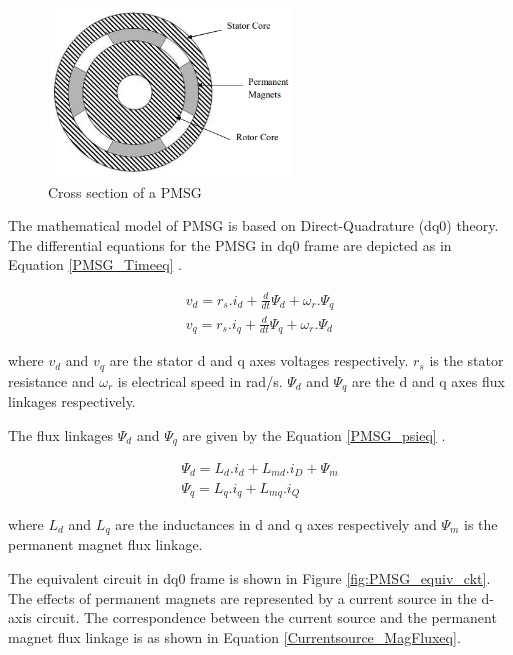 \begin{figure}[]
\centering
    \includegraphics[height = 4.5cm,width = 6.5cm]{Diagrams/Chapter_2/PMSG.PNG}
    \caption{Cross section of a PMSG \cite{sebastian_transient_1989}}
    \label{fig:PMSG}
\end{figure}

The mathematical model of \gls{PMSG} is based on Direct-Quadrature (dq0) theory. The differential equations for the \gls{PMSG} in dq0 frame are depicted as in Equation \ref{PMSG_Timeeq} \cite{sebastian_transient_1989}.  

\begin{equation}\label{PMSG_Timeeq}
\begin{aligned}
    v_d = r_s . i_d + \frac{d}{dt} \Psi_d +\omega_r . \Psi_q \\
    v_q = r_s . i_q + \frac{d}{dt} \Psi_q +\omega_r . \Psi_d
\end{aligned}
\end{equation}

where $v_d$ and $v_q$ are the stator d and q axes voltages respectively. $r_s$ is the stator resistance and $\omega_r$ is electrical speed in rad/s. $\Psi_d$ and $\Psi_q$ are the d and q axes flux linkages respectively.

The flux linkages $\Psi_d$ and $\Psi_q$ are given by the Equation \ref{PMSG_psieq} \cite{rtds_tech}.

\begin{equation}\label{PMSG_psieq}
\begin{aligned}
    \Psi_d = L_d . i_d + L_{md} . i_D  + \Psi_m \\
    \Psi_q = L_q . i_q + L_{mq} . i_Q
\end{aligned}
\end{equation}

where $L_d$ and $L_q$ are the inductances in d and q axes respectively and $\Psi_m$ is the permanent magnet flux linkage.

The equivalent circuit in dq0 frame is shown in Figure \ref{fig:PMSG_equiv_ckt}. The effects of permanent magnets are represented by a current source in the d-axis circuit. The correspondence between the current source and the permanent magnet flux linkage is as shown in Equation \ref{Currentsource_MagFluxeq}.

